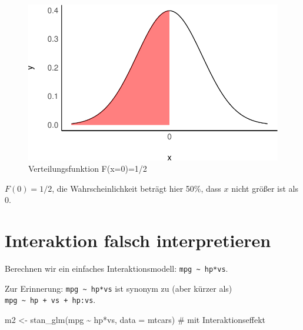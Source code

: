 \documentclass[
  a4paper,
  DIV=11]{scrreprt}
\newenvironment{Shaded}{\begin{snugshade}}{\end{snugshade}}
\newcommand{\AttributeTok}[1]{\textcolor[rgb]{0.40,0.45,0.13}{#1}}
\newcommand{\CommentTok}[1]{\textcolor[rgb]{0.37,0.37,0.37}{#1}}
\newcommand{\FunctionTok}[1]{\textcolor[rgb]{0.28,0.35,0.67}{#1}}
\newcommand{\NormalTok}[1]{\textcolor[rgb]{0.00,0.23,0.31}{#1}}
\newcommand{\OtherTok}[1]{\textcolor[rgb]{0.00,0.23,0.31}{#1}}
\newcommand{\SpecialCharTok}[1]{\textcolor[rgb]{0.37,0.37,0.37}{#1}}
\theoremstyle{definition}
\theoremstyle{remark}
\begin{document}
\begin{figure}

{\centering \includegraphics{./abschluss_files/figure-pdf/fig-F-1.pdf}

}

\caption{\label{fig-F}Verteilungsfunktion F(x=0)=1/2}

\end{figure}

\(F(0)=1/2\), die Wahrscheinlichkeit beträgt hier 50\%, dass \(x\) nicht
größer ist als 0.

\hypertarget{interaktion-falsch-interpretieren}{%
\section{Interaktion falsch interpretieren
🤷}\label{interaktion-falsch-interpretieren}}

Berechnen wir ein einfaches Interaktionsmodell:
\texttt{mpg\ \textasciitilde{}\ hp*vs}.

\begin{tcolorbox}[enhanced jigsaw, leftrule=.75mm, left=2mm, bottomrule=.15mm, opacityback=0, coltitle=black, colbacktitle=quarto-callout-note-color!10!white, opacitybacktitle=0.6, rightrule=.15mm, toptitle=1mm, colback=white, colframe=quarto-callout-note-color-frame, arc=.35mm, toprule=.15mm, breakable, titlerule=0mm, bottomtitle=1mm, title=\textcolor{quarto-callout-note-color}{\faInfo}\hspace{0.5em}{Hinweis}]
Zur Erinnerung: \texttt{mpg\ \textasciitilde{}\ hp*vs} ist synonym zu
(aber kürzer als) \texttt{mpg\ \textasciitilde{}\ hp\ +\ vs\ +\ hp:vs}.
\end{tcolorbox}

\begin{Shaded}
\begin{Highlighting}[]
\NormalTok{m2 }\OtherTok{\textless{}{-}} \FunctionTok{stan\_glm}\NormalTok{(mpg }\SpecialCharTok{\textasciitilde{}}\NormalTok{ hp}\SpecialCharTok{*}\NormalTok{vs, }\AttributeTok{data =}\NormalTok{ mtcars)  }\CommentTok{\# mit Interaktionseffekt}
\end{Highlighting}
\end{Shaded}
\end{document}
